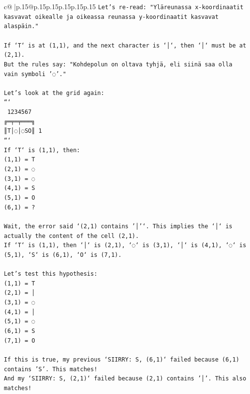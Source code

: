 \documentclass{article}
\begin{document}
{\begin{supertabular}{c@{$\;$}|p{.15\linewidth}@{}p{.15\linewidth}p{.15\linewidth}p{.15\linewidth}p{.15\linewidth}p{.15\linewidth}}
{{{\texttt{Let's re{-}read: "Yläreunassa x{-}koordinaatit kasvavat oikealle ja oikeassa reunassa y{-}koordinaatit kasvavat alaspäin."} \\
\\ 
\texttt{If `T` is at (1,1), and the next character is `│`, then `│` must be at (2,1).} \\
\texttt{But the rules say: "Kohdepolun on oltava tyhjä, eli siinä saa olla vain symboli '◌'."} \\
\\ 
\texttt{Let's look at the grid again:} \\
\texttt{```} \\
\texttt{ 1234567} \\
\texttt{╔═╤═╤═══╗} \\
\texttt{║T│◌│◌SO║ 1} \\
\texttt{```} \\
\texttt{If `T` is (1,1), then:} \\
\texttt{(1,1) = T} \\
\texttt{(2,1) = ◌} \\
\texttt{(3,1) = ◌} \\
\texttt{(4,1) = S} \\
\texttt{(5,1) = O} \\
\texttt{(6,1) = ?} \\
\\ 
\texttt{Wait, the error said `(2,1) contains '│'`. This implies the `│` is actually the content of the cell (2,1).} \\
\texttt{If `T` is (1,1), then `│` is (2,1), `◌` is (3,1), `│` is (4,1), `◌` is (5,1), `S` is (6,1), `O` is (7,1).} \\
\\ 
\texttt{Let's test this hypothesis:} \\
\texttt{(1,1) = T} \\
\texttt{(2,1) = │} \\
\texttt{(3,1) = ◌} \\
\texttt{(4,1) = │} \\
\texttt{(5,1) = ◌} \\
\texttt{(6,1) = S} \\
\texttt{(7,1) = O} \\
\\ 
\texttt{If this is true, my previous `SIIRRY: S, (6,1)` failed because (6,1) contains 'S'. This matches!} \\
\texttt{And my `SIIRRY: S, (2,1)` failed because (2,1) contains '│'. This also matches!} \\
}}}
\end{supertabular}}
\end{document}

